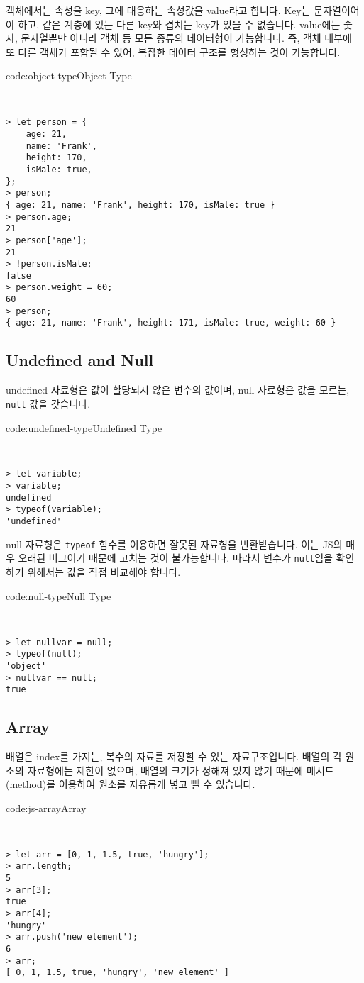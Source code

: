 객체에서는 속성을 key, 그에 대응하는 속성값을 value라고 합니다. Key는 문자열이어야 하고, 같은 계층에 있는 다른 key와 겹치는 key가 있을 수 없습니다. value에는 숫자, 문자열뿐만 아니라 객체 등 모든 종류의 데이터형이 가능합니다. 즉, 객체 내부에 또 다른 객체가 포함될 수 있어, 복잡한 데이터 구조를 형성하는 것이 가능합니다. 

\begin{codeenv}{code:object-type}{Object Type}\begin{verbatim}


> let person = {
    age: 21,
    name: 'Frank',
    height: 170,
    isMale: true,
};
> person;
{ age: 21, name: 'Frank', height: 170, isMale: true }
> person.age;
21
> person['age'];
21
> !person.isMale;
false
> person.weight = 60;
60
> person;
{ age: 21, name: 'Frank', height: 171, isMale: true, weight: 60 }
\end{verbatim}
\end{codeenv}

\subsection*{Undefined and Null}

undefined 자료형은 값이 할당되지 않은 변수의 값이며, null 자료형은 값을 모르는, \verb|null| 값을 갖습니다. 

\begin{codeenv}{code:undefined-type}{Undefined Type}\begin{verbatim}


> let variable;
> variable;
undefined
> typeof(variable);
'undefined'
\end{verbatim}
\end{codeenv}

null 자료형은 \verb|typeof| 함수를 이용하면 잘못된 자료형을 반환받습니다. 이는 JS의 매우 오래된 버그이기 때문에 고치는 것이 불가능합니다. 따라서 변수가 \verb|null|임을 확인하기 위해서는 값을 직접 비교해야 합니다. 

\begin{codeenv}{code:null-type}{Null Type}\begin{verbatim}


> let nullvar = null;
> typeof(null);
'object'
> nullvar == null;
true
\end{verbatim}
\end{codeenv}

\subsection*{Array}

배열은 index를 가지는, 복수의 자료를 저장할 수 있는 자료구조입니다. 배열의 각 원소의 자료형에는 제한이 없으며, 배열의 크기가 정해져 있지 않기 때문에 메서드(method)를 이용하여 원소를 자유롭게 넣고 뺄 수 있습니다. 

\begin{codeenv}{code:js-array}{Array}\begin{verbatim}


> let arr = [0, 1, 1.5, true, 'hungry'];
> arr.length;
5
> arr[3];
true
> arr[4];
'hungry'
> arr.push('new element');
6
> arr;
[ 0, 1, 1.5, true, 'hungry', 'new element' ]
\end{verbatim}
\end{codeenv}
